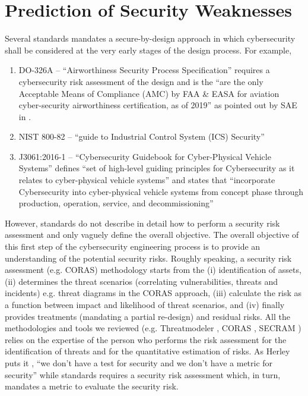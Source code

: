 \documentclass[conference]{IEEEtran}
\begin{document}
\section{Prediction of Security Weaknesses}\label{sec:theory}
Several standards mandates a secure-by-design approach in which cybersecurity
shall be considered at the very early stages of the design process.  For
example,
\begin{enumerate}[noitemsep]
	\item DO-326A -- ``Airworthiness Security Process Specification''
		requires a cybersecurity risk assessment of the design and is
		the ``are the only Acceptable Means of Compliance (AMC) by FAA
		\& EASA for aviation cyber-security airworthiness certification,
		as of 2019'' as pointed out by SAE in \autocite{SAE2019DO326A}.
	\item NIST 800-82 \autocite{Stouffer2011guide} -- ``guide to Industrial
		Control System (ICS) Security''
	\item J3061:2016-1 \autocite{SAE2016J3061} -- ``Cybersecurity Guidebook
		for Cyber-Physical Vehicle Systems'' defines ``set of
		high-level guiding principles for Cybersecurity as it relates
		to cyber-physical vehicle systems'' and states that
		``incorporate Cybersecurity into cyber-physical vehicle systems
		from concept phase through production, operation, service, and
		decommissioning''
\end{enumerate}
However, standards do not describe in detail how to perform a security risk 
assessment and only vaguely define the overall objective. The overall
objective of this first step of the cybersecurity engineering process
is to provide an understanding of the potential security risks.
Roughly speaking, a security risk assessment (e.g. CORAS\autocite{Lund2010model}) 
methodology starts from the (i) identification of assets, (ii) determines
the threat scenarios (correlating vulnerabilities, threats and incidents) e.g. 
threat diagrams in the CORAS
approach, (iii) calculate the risk as a function
between impact and likelihood of threat scenarios, and (iv) finally provides
treatments (mandating a partial re-design) and residual risks.
All the methodologies and tools we reviewed (e.g. Threatmodeler \autocite{Threatmodeler},
CORAS \autocite{Lund2010model}, SECRAM \autocite{De2015role})
relies on the expertise of the person who performs the risk assessment for
the identification of threats and for the quantitative estimation of risks.
As Herley puts it \autocite{Herley2016usenixvideo}, ``we don't have a test for security and
we don't have a metric for security'' while standards requires a security risk assessment
which, in turn, mandates a metric to evaluate the security risk. 
\end{document}
